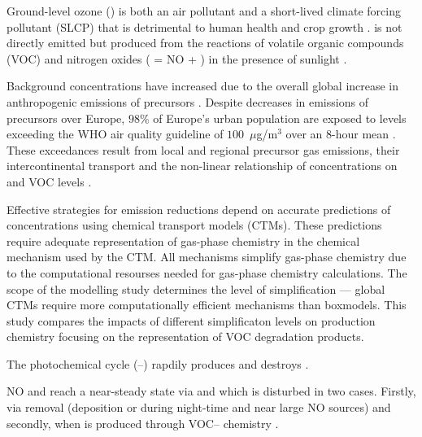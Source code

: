 Ground-level ozone () is both an air pollutant and a short-lived climate forcing pollutant (SLCP) that is detrimental to human health and crop growth \citep{AQEU:2014}. 
 is not directly emitted but produced from the reactions of volatile organic compounds (VOC) and nitrogen oxides ( = NO + ) in the presence of sunlight \citep{Atkinson:2000}.

Background  concentrations have increased due to the overall global increase in anthropogenic emissions of  precursors \citep{HTAP:2010}.
Despite decreases in emissions of  precursors over Europe, $98$\% of Europe's urban population are exposed to levels exceeding the WHO air quality guideline of \mbox{$100$ $\mu$g/m$^3$} over an \mbox{$8$-hour} mean \citep{WHO:2006}. 
These exceedances result from local and regional  precursor gas emissions, their intercontinental transport and the non-linear relationship of  concentrations on  and VOC levels \citep{AQEU:2014}.

Effective strategies for emission reductions depend on accurate predictions of  concentrations using chemical transport models (CTMs). 
These predictions require adequate representation of gas-phase chemistry in the chemical mechanism used by the CTM. 
All mechanisms simplify gas-phase chemistry due to the computational resourses needed for gas-phase chemistry calculations.
The scope of the modelling study determines the level of simplification --- global CTMs require more computationally efficient mechanisms than boxmodels.
This study compares the impacts of different simplificaton levels on  production chemistry focusing on the representation of VOC degradation products.

The photochemical cycle (--) rapdily produces and destroys . 
\begin{reactionlist}
\end{reactionlist}
NO and  reach a near-steady state via  and  which is disturbed in two cases. 
Firstly, via  removal (deposition or  during night-time and near large NO sources) and secondly, when  is produced through VOC-- chemistry \citep{Sillman:1999}.


